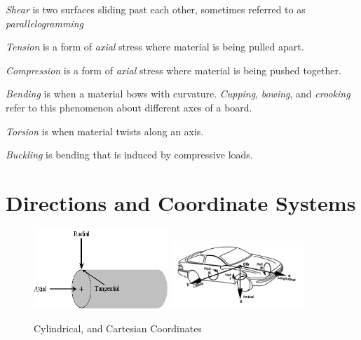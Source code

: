 \begin{asparaenum}[a)]
	\item \textit{Shear} is two surfaces sliding past each other, sometimes referred to as \textit{parallelogramming} 
	\item \textit{Tension} is a form of \textit{axial} stress where material is being pulled apart.  
	\item \textit{Compression} is a form of \textit{axial} stress where material is being pushed together. 
	\item \textit{Bending} is when a material bows with curvature. \textit{Cupping}, \textit{bowing}, and \textit{crooking} refer to this phenomenon about different axes of a board. 
	\item \textit{Torsion} is when material twists along an axis. 
	\item \textit{Buckling} is bending that is induced by compressive loads.
\end{asparaenum}

\section{Directions and Coordinate Systems}
\begin{figure}[H]
\includegraphics[width=0.45\textwidth]{imgs/cylindrical_coords.png}
\includegraphics[width=0.45\textwidth]{imgs/sae_coords.png}
\caption{Cylindrical, and Cartesian Coordinates}
\end{figure}


